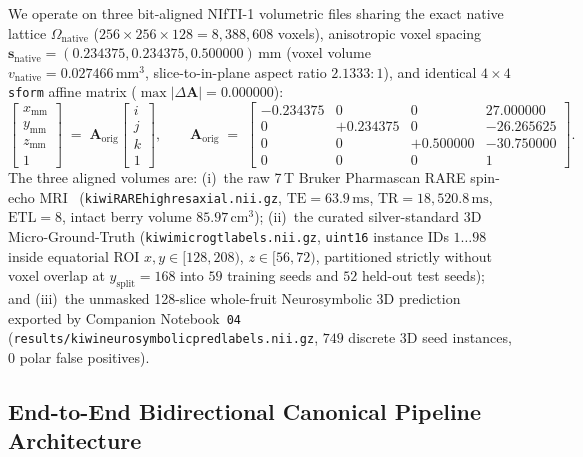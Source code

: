 \documentclass[10pt,a4paper]{article}
\renewcommand{\_}{\origunderscore\allowbreak}
\begin{document}
We operate on three bit-aligned NIfTI-1 volumetric files sharing the exact native lattice $\Omega_{\text{native}}$ ($256 \times 256 \times 128 = 8{,}388{,}608$ voxels), anisotropic voxel spacing $\mathbf{s}_{\text{native}} = (0.234375, 0.234375, 0.500000)\,\text{mm}$ (voxel volume $v_{\text{native}} = 0.027466\,\text{mm}^3$, slice-to-in-plane aspect ratio $2.1333:1$), and identical $4\times 4$ \texttt{sform} affine matrix ($\max|\Delta \mathbf{A}| = 0.000000$):
\begin{equation}
    \begin{bmatrix} x_{\text{mm}} \\ y_{\text{mm}} \\ z_{\text{mm}} \\ 1 \end{bmatrix}
    \;=\;
    \mathbf{A}_{\text{orig}}
    \begin{bmatrix} i \\ j \\ k \\ 1 \end{bmatrix},
    \qquad
    \mathbf{A}_{\text{orig}} \;=\;
    \begin{bmatrix}
        -0.234375 & 0 & 0 & 27.000000 \\
        0 & +0.234375 & 0 & -26.265625 \\
        0 & 0 & +0.500000 & -30.750000 \\
        0 & 0 & 0 & 1
    \end{bmatrix}.
    \label{eq:a_orig}
\end{equation}
The three aligned volumes are: (i)~the raw 7\,T Bruker Pharmascan RARE spin-echo MRI~\cite{hennig1986rare} (\texttt{kiwi\_20050217191129\_131073\_RARE\_high\_res\_axial.nii.gz}, $\text{TE}=63.9\,\text{ms}$, $\text{TR}=18{,}520.8\,\text{ms}$, $\text{ETL}=8$, intact berry volume $85.97\,\text{cm}^3$); (ii)~the curated silver-standard 3D Micro-Ground-Truth (\texttt{kiwi\_micro\_gt\_labels.nii.gz}, \texttt{uint16} instance IDs $1\dots 98$ inside equatorial ROI $x, y \in [128, 208)$, $z \in [56, 72)$, partitioned strictly without voxel overlap at $y_{\text{split}}=168$ into $59$ training seeds and $52$ held-out test seeds); and (iii)~the unmasked 128-slice whole-fruit Neurosymbolic 3D prediction exported by Companion Notebook~\texttt{04} (\texttt{results/kiwi\_neurosymbolic\_pred\_labels.nii.gz}, $749$ discrete 3D seed instances, $0$ polar false positives).

\subsection{End-to-End Bidirectional Canonical Pipeline Architecture}
\label{sec:meth_pipeline}
\end{document}
